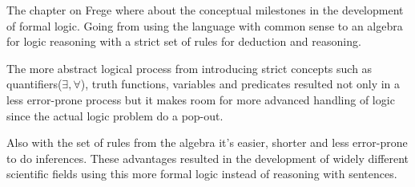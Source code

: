 \documentclass{article}
\begin{document}

    The chapter on Frege where about the conceptual milestones in the development of
    formal logic. Going from using the language with common sense to an algebra for 
    logic reasoning with a strict set of rules for deduction and reasoning. 
    
    The more abstract logical process from introducing strict concepts
    such as quantifiers($\exists,\forall$), truth functions, variables and
    predicates resulted not only in a less error-prone process but it makes 
    room for more advanced handling of logic since the actual logic problem do
    a pop-out.
    
    Also with the set of rules from the algebra it's easier, shorter and less
    error-prone to do inferences.
    These advantages resulted in the development of widely different
    scientific fields using this more formal logic instead of reasoning with
    sentences.
\end{document}
